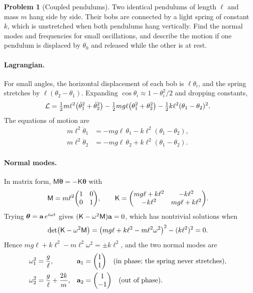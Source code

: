 \documentclass[11pt]{article}
\theoremstyle{definition}
\newtheorem{problem}{Problem}
\newcommand{\Lag}{\mathcal{L}}
\begin{document}
\begin{problem}[Coupled pendulums]\label{prob:coupled}
Two identical pendulums of length $\ell$ and mass $m$ hang side by side. Their bobs are connected by a light spring of constant $k$, which is unstretched when both pendulums hang vertically. Find the normal modes and frequencies for small oscillations, and describe the motion if one pendulum is displaced by $\theta_0$ and released while the other is at rest.
\end{problem}

\paragraph{Lagrangian.} For small angles, the horizontal displacement of each bob is $\ell\theta_i$, and the spring stretches by $\ell(\theta_2 - \theta_1)$. Expanding $\cos\theta_i \approx 1 - \theta_i^2/2$ and dropping constants,
\begin{equation}
  \Lag = \tfrac12 m\ell^2\qty(\dot\theta_1^2 + \dot\theta_2^2) - \tfrac12 mg\ell\qty(\theta_1^2 + \theta_2^2) - \tfrac12 k\ell^2(\theta_1 - \theta_2)^2.
\end{equation}
The equations of motion are
\begin{align}
  m\ell^2\ddot\theta_1 &= -mg\ell\,\theta_1 - k\ell^2(\theta_1 - \theta_2), \\
  m\ell^2\ddot\theta_2 &= -mg\ell\,\theta_2 + k\ell^2(\theta_1 - \theta_2).
\end{align}

\paragraph{Normal modes.} In matrix form, $\mathsf{M}\ddot{\boldsymbol\theta} = -\mathsf{K}\boldsymbol\theta$ with
\[
  \mathsf{M} = m\ell^2\mqty(\imat{2}), \qquad
  \mathsf{K} = \mqty(mg\ell + k\ell^2 & -k\ell^2 \\ -k\ell^2 & mg\ell + k\ell^2).
\]
Trying $\boldsymbol\theta = \vb{a}\,e^{i\omega t}$ gives $(\mathsf{K} - \omega^2\mathsf{M})\vb{a} = 0$, which has nontrivial solutions when
\[
  \det(\mathsf{K} - \omega^2\mathsf{M}) = \qty(mg\ell + k\ell^2 - m\ell^2\omega^2)^2 - (k\ell^2)^2 = 0.
\]
Hence $mg\ell + k\ell^2 - m\ell^2\omega^2 = \pm k\ell^2$, and the two normal modes are
\begin{align}
  \omega_1^2 &= \frac{g}{\ell}, & \vb{a}_1 &= \mqty(1 \\ 1) \quad \text{(in phase; the spring never stretches)}, \\
  \omega_2^2 &= \frac{g}{\ell} + \frac{2k}{m}, & \vb{a}_2 &= \mqty(1 \\ -1) \quad \text{(out of phase)}.
\end{align}
\end{document}
